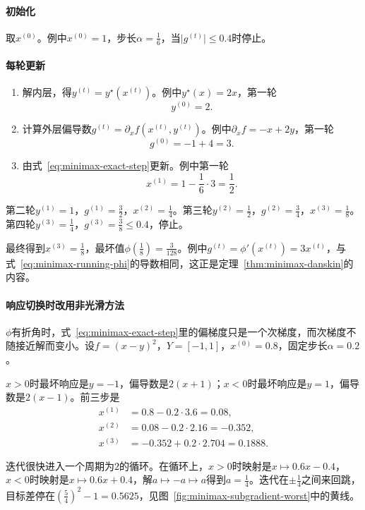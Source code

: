 \paragraph{初始化}
取$x^{(0)}$。例中$x^{(0)}=1$，步长$\alpha=\frac16$，当$\lvert g^{(t)}\rvert\leq0.4$时停止。

\paragraph{每轮更新}
\begin{enumerate}
 \item 解内层，得$y^{(t)}=y^\star(x^{(t)})$。例中$y^\star(x)=2x$，第一轮
 \[
  y^{(0)}=2.
 \]
 \item 计算外层偏导数$g^{(t)}=\partial_xf(x^{(t)},y^{(t)})$。例中$\partial_xf=-x+2y$，第一轮
 \[
  g^{(0)}=-1+4=3.
 \]
 \item 由式~\eqref{eq:minimax-exact-step}更新。例中第一轮
 \[
  x^{(1)}=1-\frac16\cdot3=\frac12.
 \]
\end{enumerate}

第二轮$y^{(1)}=1$，$g^{(1)}=\frac32$，$x^{(2)}=\frac14$。第三轮$y^{(2)}=\frac12$，$g^{(2)}=\frac34$，$x^{(3)}=\frac18$。第四轮$y^{(3)}=\frac14$，$g^{(3)}=\frac38\leq0.4$，停止。

最终得到$x^{(3)}=\frac18$，最坏值$\phi(\frac18)=\frac{3}{128}$。例中$g^{(t)}=\phi'(x^{(t)})=3x^{(t)}$，与式~\eqref{eq:minimax-running-phi}的导数相同，这正是定理~\ref{thm:minimax-danskin}的内容。

\paragraph{响应切换时改用非光滑方法}
$\phi$有折角时，式~\eqref{eq:minimax-exact-step}里的偏梯度只是一个次梯度，而次梯度不随接近解而变小。设$f=(x-y)^2$，$Y=[-1,1]$，$x^{(0)}=0.8$，固定步长$\alpha=0.2$。

$x>0$时最坏响应是$y=-1$，偏导数是$2(x+1)$；$x<0$时最坏响应是$y=1$，偏导数是$2(x-1)$。前三步是
\[
 \begin{aligned}
 x^{(1)}&=0.8-0.2\cdot3.6=0.08,\\
 x^{(2)}&=0.08-0.2\cdot2.16=-0.352,\\
 x^{(3)}&=-0.352+0.2\cdot2.704=0.1888.
 \end{aligned}
\]

迭代很快进入一个周期为$2$的循环。在循环上，$x>0$时映射是$x\mapsto0.6x-0.4$，$x<0$时映射是$x\mapsto0.6x+0.4$，解$a\mapsto-a\mapsto a$得到$a=\frac14$。迭代在$\pm\frac14$之间来回跳，目标差停在$(\frac54)^2-1=0.5625$，见图~\ref{fig:minimax-subgradient-worst}中的黄线。

